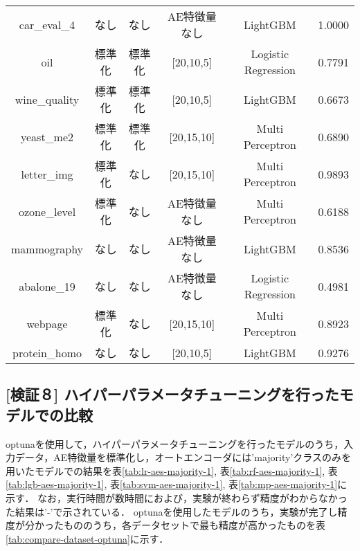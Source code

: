 \begin{table}[htbp]
\begin{tabular}{cccccc}
        car\_eval\_4 & なし & なし & AE特徴量なし & LightGBM & 1.0000\\
        oil & 標準化 & 標準化 & [20,10,5] & Logistic Regression & 0.7791\\
        wine\_quality & 標準化 & 標準化 & [20,10,5] & LightGBM & 0.6673\\
        yeast\_me2 & 標準化 & 標準化 & [20,15,10] & Multi Perceptron & 0.6890\\
        letter\_img & 標準化 & なし & [20,15,10] & Multi Perceptron & 0.9893\\
        ozone\_level & 標準化 & なし & AE特徴量なし & Multi Perceptron & 0.6188\\
        mammography & なし & なし & AE特徴量なし & LightGBM & 0.8536\\
        abalone\_19 & なし & なし & AE特徴量なし & Logistic Regression & 0.4981\\
        webpage & 標準化 & なし & [20,15,10] & Multi Perceptron & 0.8923\\
        protein\_homo & なし & なし & [20,10,5] & LightGBM & 0.9276\\
        \hline

    \end{tabular}
\end{table}

\subsection{[検証８] ハイパーパラメータチューニングを行ったモデルでの比較}
optunaを使用して，ハイパーパラメータチューニングを行ったモデルのうち，入力データ，AE特徴量を標準化し，オートエンコーダには'majority'クラスのみを用いたモデルでの結果を表\ref{tab:lr-aes-majority-1}, 表\ref{tab:rf-aes-majority-1}, 表\ref{tab:lgb-aes-majority-1}, 表\ref{tab:svm-aes-majority-1}, 表\ref{tab:mp-aes-majority-1}に示す．
なお，実行時間が数時間におよび，実験が終わらず精度がわからなかった結果は'-'で示されている．
optunaを使用したモデルのうち，実験が完了し精度が分かったもののうち，各データセットで最も精度が高かったものを表\ref{tab:compare-dataset-optuna}に示す．

